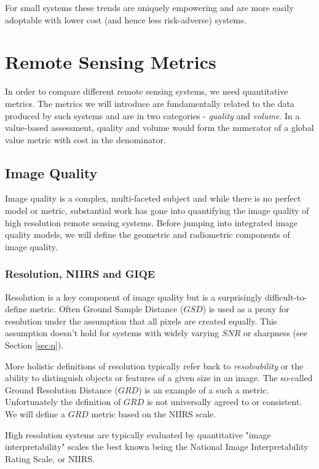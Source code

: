 \documentclass[10pt,journal]{IEEEtran}  %
\begin{document}
For small systems these trends are uniquely empowering and are more easily adoptable with lower cost (and hence less risk-adverse) systems.

\section{Remote Sensing Metrics}
\label{sec:Metrics}
In order to compare different remote sensing systems, we need quantitative metrics.  The metrics we will introduce are fundamentally related to the data produced by such systems and are in two categories - \emph{quality} and \emph{volume}.  In a value-based assessment, quality and volume would form the numerator of a global value metric with cost in the denominator.

\subsection{Image Quality}
\label{sec:iq}

Image quality is a complex, multi-faceted subject and while there is no perfect model or metric, substantial work has gone into quantifying the image quality of high resolution remote sensing systems.  Before jumping into integrated image quality models, we will define the geometric and radiometric components of image quality.

\subsubsection{Resolution, NIIRS and GIQE}
Resolution is a key component of image quality but is a surprisingly difficult-to-define metric.  Often Ground Sample Distance ($GSD$) is used as a proxy for resolution under the assumption that all pixels are created equally.  This assumption doesn't hold for systems with widely varying $SNR$ or sharpness (see Section \ref{sec:q}).

More holistic definitions of resolution typically refer back to \emph{resolvability} or the ability to distinguish objects or features of a given size in an image.  The so-called Ground Resolution Distance ($GRD$) is an example of a such a metric.  Unfortunately the definition of $GRD$ is not universally agreed to or consistent.  We will define a $GRD$ metric based on the NIIRS scale.

High resolution systems are typically evaluated by quantitative "image interpretability" scales the best known being the National Image Interpretability Rating Scale, or NIIRS.
\end{document}
